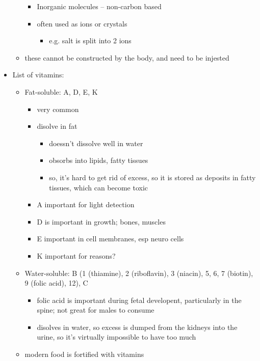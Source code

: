 \documentclass{article}
\theoremstyle{definition}
\begin{document}
\begin{itemize}
\begin{itemize}
				\begin{itemize}
					\item Inorganic molecules -- non-carbon based
					\item often used as ions or crystals
						\begin{itemize}
							\item e.g. salt is split into 2 ions 
						\end{itemize}
				\end{itemize}
			\item these cannot be constructed by the body, and need to be injested
		\end{itemize}
	\item List of vitamins:
		\begin{itemize}
			\item Fat-soluble: A, D, E, K
				\begin{itemize}
					\item very common
					\item disolve in fat
						\begin{itemize}
							\item doessn't dissolve well in water
							\item obsorbs into lipids, fatty tissues
							\item so, it's hard to get rid of excess, so it is stored as deposits in fatty tissues, which can become toxic
						\end{itemize}
					\item A important for light detection
					\item D is important in growth; bones, muscles
					\item E important in cell membranes, esp neuro cells
					\item K important for reasons?
				\end{itemize}
			\item Water-soluble: B (1 (thiamine), 2 (riboflavin), 3 (niacin), 5, 6, 7 (biotin), 9 (folic acid), 12), C
				\begin{itemize}
					\item folic acid is important during fetal developent, particularly in the spine; not great for males to consume
					\item disolves in water, so excess is dumped from the kidneys into the urine, so it's virtually impossible to have too much
				\end{itemize}
			\item modern food is fortified with vitamins
		\end{itemize}

\end{itemize}
\end{document}
